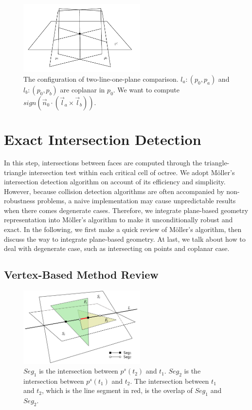 \documentclass[10pt,journal,compsoc]{IEEEtran}
\begin{document}
\begin{figure}[t]
\centering
\includegraphics[width=2.5in]{substrates}
\caption{The configuration of two-line-one-plane comparison. $l_a\colon(p_0, p_a)$ and $l_b\colon(p_0, p_b)$ are coplanar in $p_0$. We want to compute $sign(\vec{n}_0 \cdot (\vec{l}_a \times \vec{l}_b))$.}
\label{fig:substrates}
\end{figure}


\section{Exact Intersection Detection}

\label{section:isect}
In this step, intersections between faces are computed through the triangle-triangle intersection test within each critical cell of octree. We adopt M\"{o}ller's intersection detection algorithm \cite{moller1997fast} on account of its efficiency and simplicity. However, because collision detection algorithms are often accompanied by non-robustness problems, a naive implementation may cause unpredictable results when there comes degenerate cases. Therefore, we integrate plane-based geometry representation into M\"{o}ller's algorithm to make it unconditionally robust and exact. In the following, we first make a quick review of M\"{o}ller's algorithm, then discuss the way to integrate plane-based geometry. At last, we talk about how to deal with degenerate case, such as intersecting on points and coplanar case.

\subsection{Vertex-Based Method Review}

\begin{figure}[t]
\centering
\includegraphics[width=2.5in]{projection}
\caption{$Seg_1$ is the intersection between $p^s(t_2)$ and $t_1$. $Seg_2$ is the intersection between $p^s(t_1)$ and $t_2$. The intersection between $t_1$ and $t_2$, which is the line segment in red, is the overlap of $Seg_1$ and $Seg_2$.}
\label{fig_projection}
\end{figure}
\end{document}
